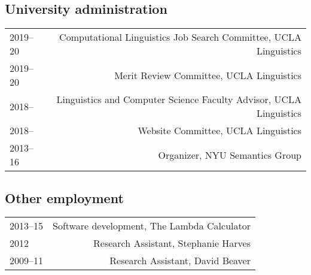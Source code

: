 \documentclass[12pt]{article}
\begin{document}
\subsection*{University administration}

\begin{longtable}{LR}
  2019--20   & Computational Linguistics Job Search Committee, UCLA Linguistics\\
  2019--20   & Merit Review Committee, UCLA Linguistics\\
  2018--     & Linguistics and Computer Science Faculty Advisor, UCLA Linguistics\\
  2018--     & Website Committee, UCLA Linguistics\\
  2013--16   & Organizer, NYU Semantics Group
\end{longtable}

\subsection*{Other employment}
\begin{longtable}{LR}
  2013--15   & Software development, The Lambda Calculator
               \\
  2012       & Research Assistant, Stephanie Harves\\
  2009--11   & Research Assistant, David Beaver
\end{longtable}


\end{document}
